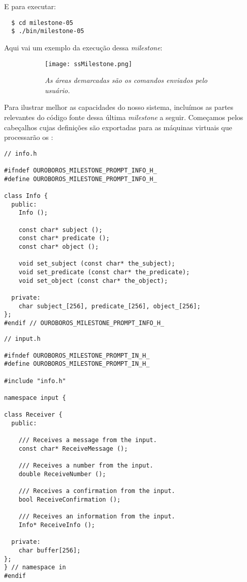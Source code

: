E para executar:

\begin{verbatim}
  $ cd milestone-05
  $ ./bin/milestone-05
\end{verbatim}

Aqui vai um exemplo da execução dessa \textit{milestone}:

\begin{figure}[ht]
      \centering
      \caption{}
      \begin{subfigure}{.8\textwidth}
        \begin{center}
          \texttt{[image: ssMilestone.png]}
          \vspace{1em}

          \textit{
            As áreas demarcadas são os comandos enviados pelo usuário.
          }
        \end{center}
      \end{subfigure}
      \label{fig:milestone}
    \end{figure}

Para ilustrar melhor as capacidades do nosso sistema, incluímos as
partes relevantes do código fonte dessa última \textit{milestone}
a seguir. Começamos pelos cabeçalhos cujas definições são exportadas
para as máquinas virtuais que processarão os :

\vspace{1em}
\begin{lstlisting}
// info.h

#ifndef OUROBOROS_MILESTONE_PROMPT_INFO_H_
#define OUROBOROS_MILESTONE_PROMPT_INFO_H_

class Info {
  public:
    Info ();

    const char* subject ();
    const char* predicate ();
    const char* object ();

    void set_subject (const char* the_subject);
    void set_predicate (const char* the_predicate);
    void set_object (const char* the_object);

  private:
    char subject_[256], predicate_[256], object_[256];
};
#endif // OUROBOROS_MILESTONE_PROMPT_INFO_H_
\end{lstlisting}
\vspace{1em}
\begin{lstlisting}
// input.h  

#ifndef OUROBOROS_MILESTONE_PROMPT_IN_H_
#define OUROBOROS_MILESTONE_PROMPT_IN_H_

#include "info.h"

namespace input {

class Receiver {
  public:

    /// Receives a message from the input.
    const char* ReceiveMessage ();
    
    /// Receives a number from the input.
    double ReceiveNumber ();
    
    /// Receives a confirmation from the input.
    bool ReceiveConfirmation ();

    /// Receives an information from the input.
    Info* ReceiveInfo ();

  private:
    char buffer[256];
};
} // namespace in
#endif
\end{lstlisting}

